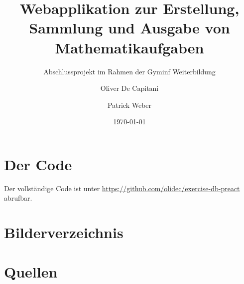 \documentclass[12pt,a4paper]{scrartcl} %
\title{Webapplikation zur Erstellung, Sammlung und Ausgabe von Mathematikaufgaben}
\subtitle{Abschlussprojekt im Rahmen der Gyminf Weiterbildung}
\date{\today}
\author{Oliver De Capitani \and Patrick Weber}
\begin{document}
\maketitle %
% 



\newpage %
\tableofcontents %

\newpage


\newpage

 

 \newpage

 


\newpage



% 

\newpage

% 




\newpage
   
  
\appendix
\section{Der Code}

Der vollständige Code ist unter \url{https://github.com/olidec/exercise-db-preact} abrufbar. 
\newpage





\section{Bilderverzeichnis}
\listoffigures

 

\newpage
\section{Quellen}
\end{document}
